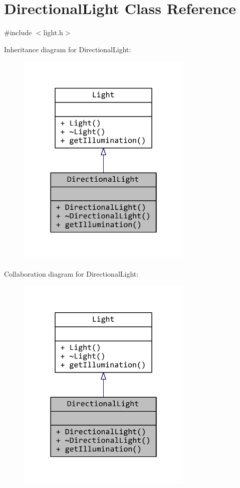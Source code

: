 \hypertarget{classDirectionalLight}{\section{Directional\+Light Class Reference}
\label{classDirectionalLight}
}


{\ttfamily \#include $<$light.\+h$>$}



Inheritance diagram for Directional\+Light\+:
\nopagebreak
\begin{figure}[H]
\begin{center}
\leavevmode
\includegraphics[width=238pt]{classDirectionalLight__inherit__graph}
\end{center}
\end{figure}


Collaboration diagram for Directional\+Light\+:
\nopagebreak
\begin{figure}[H]
\begin{center}
\leavevmode
\includegraphics[width=238pt]{classDirectionalLight__coll__graph}
\end{center}
\end{figure}
